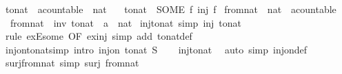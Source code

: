 \begin{isabellebody}
%
\endisatagdocument
{\isafolddocument}%
%
\isadelimdocument
%
\endisadelimdocument
{}\isamarkupfalse%
\ to{\isacharunderscore}nat\ {\isacharcolon}{\isacharcolon}\ {\isachardoublequoteopen}{\isacharprime}a{\isacharcolon}{\isacharcolon}countable\ {\isasymRightarrow}\ nat{\isachardoublequoteclose}\ \isanewline
\ \ {\isachardoublequoteopen}to{\isacharunderscore}nat\ {\isacharequal}\ {\isacharparenleft}SOME\ f{\isachardot}\ inj\ f{\isacharparenright}{\isachardoublequoteclose}\isanewline
\isanewline
{}\isamarkupfalse%
\ from{\isacharunderscore}nat\ {\isacharcolon}{\isacharcolon}\ {\isachardoublequoteopen}nat\ {\isasymRightarrow}\ {\isacharprime}a{\isacharcolon}{\isacharcolon}countable{\isachardoublequoteclose}\ \isanewline
\ \ {\isachardoublequoteopen}from{\isacharunderscore}nat\ {\isacharequal}\ inv\ {\isacharparenleft}to{\isacharunderscore}nat\ {\isacharcolon}{\isacharcolon}\ {\isacharprime}a\ {\isasymRightarrow}\ nat{\isacharparenright}{\isachardoublequoteclose}\isanewline
\isanewline
{}\isamarkupfalse%
\ inj{\isacharunderscore}to{\isacharunderscore}nat\ {\isacharbrackleft}simp{\isacharbrackright}{\isacharcolon}\ {\isachardoublequoteopen}inj\ to{\isacharunderscore}nat{\isachardoublequoteclose}\isanewline
%
\isadelimproof
\ \ %
\endisadelimproof
%
\isatagproof
{}\isamarkupfalse%
\ {\isacharparenleft}rule\ exE{\isacharunderscore}some\ {\isacharbrackleft}OF\ ex{\isacharunderscore}inj{\isacharbrackright}{\isacharparenright}\ {\isacharparenleft}simp\ add{\isacharcolon}\ to{\isacharunderscore}nat{\isacharunderscore}def{\isacharparenright}%
\endisatagproof
{\isafoldproof}%
%
\isadelimproof
\isanewline
%
\endisadelimproof
\isanewline
{}\isamarkupfalse%
\ inj{\isacharunderscore}on{\isacharunderscore}to{\isacharunderscore}nat{\isacharbrackleft}simp{\isacharcomma}\ intro{\isacharbrackright}{\isacharcolon}\ {\isachardoublequoteopen}inj{\isacharunderscore}on\ to{\isacharunderscore}nat\ S{\isachardoublequoteclose}\isanewline
%
\isadelimproof
\ \ %
\endisadelimproof
%
\isatagproof
{}\isamarkupfalse%
\ inj{\isacharunderscore}to{\isacharunderscore}nat\ \isamarkupfalse%
\ {\isacharparenleft}auto\ simp{\isacharcolon}\ inj{\isacharunderscore}on{\isacharunderscore}def{\isacharparenright}%
\endisatagproof
{\isafoldproof}%
%
\isadelimproof
\isanewline
%
\endisadelimproof
\isanewline
{}\isamarkupfalse%
\ surj{\isacharunderscore}from{\isacharunderscore}nat\ {\isacharbrackleft}simp{\isacharbrackright}{\isacharcolon}\ {\isachardoublequoteopen}surj\ from{\isacharunderscore}nat{\isachardoublequoteclose}\isanewline

\end{isabellebody}
